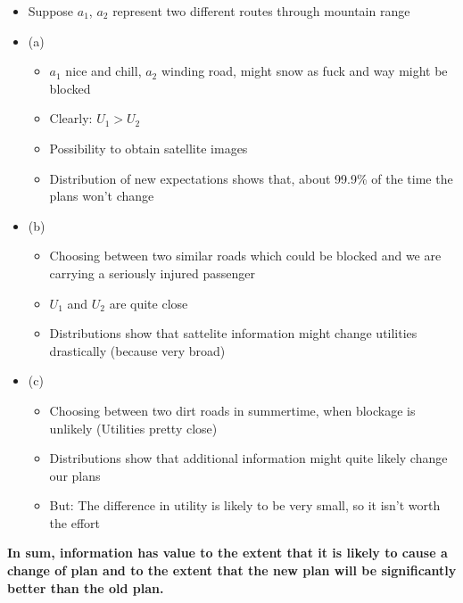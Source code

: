 \documentclass{scrartcl}
\begin{document}
\begin{itemize}
    \item
        Suppose \(a_1\), \(a_2\) represent two different routes through mountain range
    \item
        (a)
        \begin{itemize}
            \item
                \(a_1\) nice and chill, \(a_2\) winding road, might snow as fuck and way might be blocked
            \item
                Clearly: \(U_1 > U_2\)
            \item
                Possibility to obtain satellite images
            \item
                Distribution of new expectations shows that, about 99.9\% of the time the plans won't change
        \end{itemize}
    \item
        (b)
        \begin{itemize}
            \item
                Choosing between two similar roads which could be blocked and we are carrying a seriously injured passenger 
            \item
                \(U_1\) and \(U_2\) are quite close
            \item
                Distributions show that sattelite information might change utilities drastically (because very broad)
        \end{itemize}
    \item
        (c)
        \begin{itemize}
            \item
                Choosing between two dirt roads in summertime, when blockage is unlikely (Utilities pretty close)
            \item
                Distributions show that additional information might quite likely change our plans
            \item
                But: The difference in utility is likely to be very small, so it isn't worth the effort
        \end{itemize}
\end{itemize}

\bigbreak

\textbf{In sum, information has value to the extent that it is likely to cause a change of plan and to the extent that the new plan will be significantly better than the old plan.}
\end{document}
